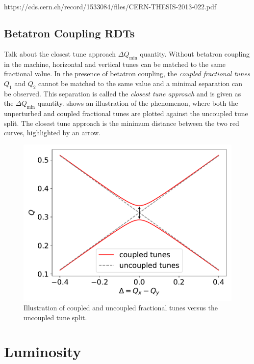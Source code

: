 https://cds.cern.ch/record/1533084/files/CERN-THESIS-2013-022.pdf


\subsection{Betatron Coupling RDTs}

Talk about the closest tune approach \(\Delta Q_{\mathrm{min}}\) quantity.
Without betatron coupling in the machine, horizontal and vertical tunes can be matched to the same fractional value.
In the presence of betatron coupling, the \emph{coupled fractional tunes} \(Q_1\) and \(Q_2\) cannot be matched to the same value and a minimal separation can be observed.
This separation is called the \emph{closest tune approach} and is given as the \(\Delta Q_{\mathrm{min}}\) quantity.
 shows an illustration of the phenomenon, where both the unperturbed and coupled fractional tunes are plotted against the uncoupled tune split.
The closest tune approach is the minimum distance between the two red curves, highlighted by an arrow.

\begin{figure}[!htb]
    \begin{center}
    \includegraphics[width = 0.9\linewidth]{Figures/Chapter2/tune_perturbation.pdf}
    \caption{Illustration of coupled and uncoupled fractional tunes versus the uncoupled tune split.}
    \label{figure:closest_tune_approach}
    \end{center}
\end{figure}


\section{Luminosity}

